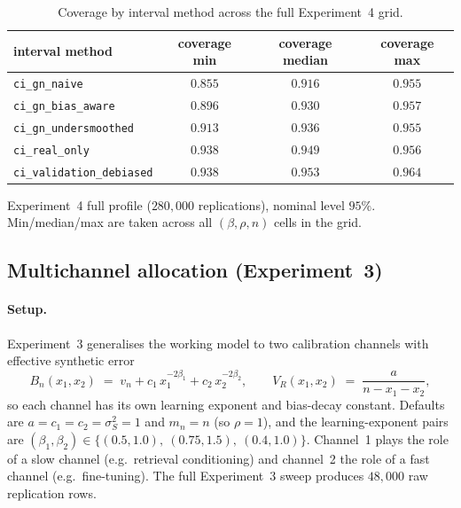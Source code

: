 \begin{table}[!t]
  \centering
  \caption{Coverage by interval method across the full Experiment~4 grid.}
  \label{tab:coverage}
  \begin{threeparttable}
  \begin{tabular}{lccc}
    \toprule
    interval method & coverage min & coverage median & coverage max \\
    \midrule
    \texttt{ci\_gn\_naive}             & $0.855$ & $0.916$ & $0.955$ \\
    \texttt{ci\_gn\_bias\_aware}       & $0.896$ & $0.930$ & $0.957$ \\
    \texttt{ci\_gn\_undersmoothed}     & $0.913$ & $0.936$ & $0.955$ \\
    \texttt{ci\_real\_only}            & $0.938$ & $0.949$ & $0.956$ \\
    \texttt{ci\_validation\_debiased}  & $0.938$ & $0.953$ & $0.964$ \\
    \bottomrule
  \end{tabular}
  \begin{tablenotes}
    \small
    \item[a] Experiment~4 full profile ($280{,}000$ replications), nominal
    level $95\%$. Min/median/max are taken across all $(\beta,\rho,n)$ cells
    in the grid.
  \end{tablenotes}
  \end{threeparttable}
\end{table}

\subsection{Multichannel allocation (Experiment~3)}\label{app:exp3}

\paragraph{Setup.} Experiment~3 generalises the working model to two calibration channels with effective synthetic error
\[
B_n(x_1, x_2) \;=\; v_n + c_1\, x_1^{-2\beta_1} + c_2\, x_2^{-2\beta_2},
\qquad
V_R(x_1, x_2) \;=\; \frac{a}{n - x_1 - x_2},
\]
so each channel has its own learning exponent and bias-decay constant. Defaults are $a = c_1 = c_2 = \sigma_S^2 = 1$ and $m_n = n$ (so $\rho = 1$), and the learning-exponent pairs are $(\beta_1, \beta_2) \in \{(0.5, 1.0),\ (0.75, 1.5),\ (0.4, 1.0)\}$. Channel~1 plays the role of a slow channel (e.g.\ retrieval conditioning) and channel~2 the role of a fast channel (e.g.\ fine-tuning). The full Experiment~3 sweep produces $48{,}000$ raw replication rows.

